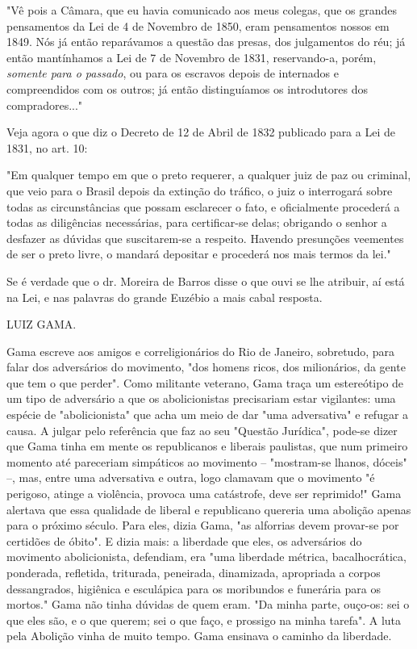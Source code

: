 "Vê pois a Câmara, que eu havia comunicado aos meus colegas, que os
grandes pensamentos da Lei de 4 de Novembro de 1850, eram pensamentos
nossos em 1849. Nós já então reparávamos a questão das presas, dos
julgamentos do réu; já então mantínhamos a Lei de 7 de Novembro de 1831,
reservando-a, porém, \emph{somente para o passado}, ou para os escravos
depois de internados e compreendidos com os outros; já então
distinguíamos os introdutores dos compradores..."

Veja agora o que diz o Decreto de 12 de Abril de 1832 publicado para a
Lei de 1831, no art. 10:

"Em qualquer tempo em que o preto requerer, a qualquer juiz de paz ou
criminal, que veio para o Brasil depois da extinção do tráfico, o juiz o
interrogará sobre todas as circunstâncias que possam esclarecer o fato,
e oficialmente procederá a todas as diligências necessárias, para
certificar-se delas; obrigando o senhor a desfazer as dúvidas que
suscitarem-se a respeito. Havendo presunções veementes de ser o preto
livre, o mandará depositar e procederá nos mais termos da lei."

Se é verdade que o dr. Moreira de Barros disse o que ouvi se lhe
atribuir, aí está na Lei, e nas palavras do grande Euzébio a mais cabal
resposta.

LUIZ GAMA.

\pagebreak
\mbox{}\vfill
\thispagestyle{empty}

{\small\noindent
Gama escreve aos amigos e correligionários do Rio de Janeiro,
sobretudo, para falar dos adversários do movimento, "dos homens ricos,
dos milionários, da gente que tem o que perder". Como militante
veterano, Gama traça um estereótipo de um tipo de adversário a que os
abolicionistas precisariam estar vigilantes: uma espécie de
"abolicionista" que acha um meio de dar "uma adversativa" e refugar a
causa. A julgar pelo referência que faz ao seu "Questão Jurídica",
pode-se dizer que Gama tinha em mente os republicanos e liberais
paulistas, que num primeiro momento até pareceriam simpáticos ao
movimento -- "mostram-se lhanos, dóceis" --, mas, entre uma adversativa
e outra, logo clamavam que o movimento "é perigoso, atinge a violência,
provoca uma catástrofe, deve ser reprimido!" Gama alertava que essa
qualidade de liberal e republicano quereria uma abolição apenas para o
próximo século. Para eles, dizia Gama, "as alforrias devem provar-se por
certidões de óbito". E dizia mais: a liberdade que eles, os adversários
do movimento abolicionista, defendiam, era "uma liberdade métrica,
bacalhocrática, ponderada, refletida, triturada, peneirada, dinamizada,
apropriada a corpos dessangrados, higiênica e esculápica para os
moribundos e funerária para os mortos." Gama não tinha dúvidas de quem
eram. "Da minha parte, ouço-os: sei o que eles são, e o que querem; sei
o que faço, e prossigo na minha tarefa". A luta pela Abolição vinha de
muito tempo. Gama ensinava o caminho da liberdade. }

